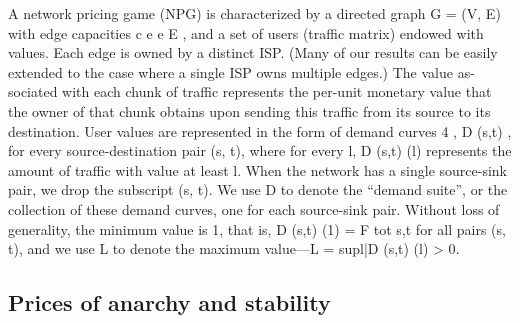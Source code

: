 \documentclass{beamer}
\begin{document}
\begin{frame}
A network pricing game (NPG) is characterized by a directed graph G = (V, E)
with edge capacities {c e } e E , and a set of users (traffic matrix) endowed with
values. Each edge is owned by a distinct ISP. (Many of our results can be easily
extended to the case where a single ISP owns multiple edges.) The value as-
sociated with each chunk of traffic represents the per-unit monetary value that
the owner of that chunk obtains upon sending this traffic from its source to its
destination. User values are represented in the form of demand curves 4 , D (s,t) ,
for every source-destination pair (s, t), where for every l, D (s,t) (l) represents the
amount of traffic with value at least l. When the network has a single source-sink
pair, we drop the subscript (s, t). We use D to denote the “demand suite”, or
the collection of these demand curves, one for each source-sink pair. Without
loss of generality, the minimum value is 1, that is, D (s,t) (1) = F tot
s,t for all pairs
(s, t), and we use L to denote the maximum value—L = sup{l|D (s,t) (l) > 0}.
\end{frame}



\subsection{Prices of anarchy and stability}
\end{document}
